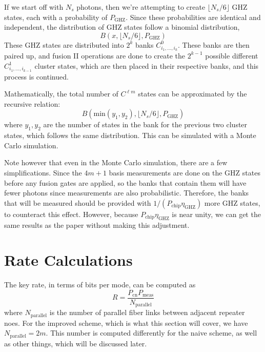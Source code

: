 \documentclass[%
 reprint,
 amsmath,amssymb
 aps,
]{revtex4}
\theoremstyle{remark}
\begin{document}
If we start off with $N_s$ photons, then we're attempting to create $\lfloor N_s/6\rfloor$ GHZ states, each with a probability of $P_\text{GHZ}.$ Since these probabilities are identical and independent, the distribution of GHZ states follow a binomial distribution,
\begin{equation}
    B(x, \lfloor N_s/6\rfloor, P_\text{GHZ})
\end{equation}
These GHZ states are distributed into $2^k$ banks $C^0_{i_1,\dots,i_k}.$ These banks are then paired up, and fusion II operations are done to create the $2^{k-1}$ possible different $C^1_{i_1,\dots,i_{k-1}}$ cluster states, which are then placed in their respective banks, and this process is continued.  

Mathematically, the total number of $C^{\ell m}$ states can be approximated by the recursive relation:
\begin{equation}
        B(\text{min}(y_1,y_2), \lfloor N_s/6\rfloor, P_\text{GHZ})
\end{equation}
where $y_1,y_2$ are the number of states in the bank for the previous two cluster states, which follows the same distribution. This can be simulated with a Monte Carlo simulation.
\vspace{2mm}

Note however that even in the Monte Carlo simulation, there are a few simplifications. Since the $4m + 1$ basis measurements are done on the GHZ states before any fusion gates are applied, so the banks that contain them will have fewer photons since measurements are also probabilistic. Therefore, the banks that will be measured should be provided with $1/(P_\text{chip}\eta_\text{GHZ})$ more GHZ states, to counteract this effect. However, because $P_\text{chip}\eta_\text{GHZ}$ is near unity, we can get the same results as the paper without making this adjustment. 
\section{Rate Calculations}
The key rate, in terms of bits per mode, can be computed as 
\begin{equation}
    R = \frac{P_\text{cn} P_\text{meas}}{N_\text{parallel}}
\end{equation}
where $N_\text{parallel}$ is the number of parallel fiber links between adjacent repeater noes. For the improved scheme, which is what this section will cover, we have $N_\text{parallel}=2m.$ This number is computed differently for the naive scheme, as well as other things, which will be discussed later.
\end{document}
